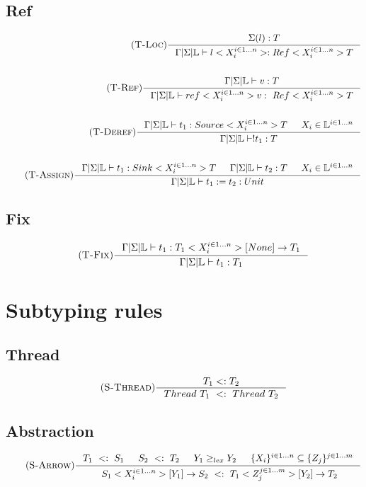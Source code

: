 \documentclass[12pt]{article}
\def\lock {\mathbb{L}}
\begin{document}
\subsection{Ref}
\begin{align*}
    \tag {\textsc{T-Loc}}
    \inference[]{\Sigma(l):T}{\Gamma|\Sigma|\lock \vdash l<X_i^{i\in 1...n}>:Ref<X_i^{i\in 1...n}>T}
    \\
    \\
    \tag {\textsc{T-Ref}}
    \inference[]{\Gamma|\Sigma|\lock \vdash v:T}{\Gamma|\Sigma|\lock \vdash ref<X_i^{i\in 1...n}> v:~Ref<X_i^{i\in 1...n}>T}
    \\
    \\
    \tag {\textsc{T-Deref}}
    \inference[]{\Gamma|\Sigma|\lock \vdash t_1:Source<X_i^{i\in 1...n}>T & X_i\in \lock^{i\in 1...n}}{\Gamma|\Sigma|\lock\vdash !t_1:T}
    \\
    \\
    \tag {\textsc{T-Assign}}
    \inference[]{\Gamma|\Sigma|\lock \vdash t_1:Sink<X_i^{i\in 1...n}>T & \Gamma|\Sigma|\lock \vdash t_2:T & X_i\in \lock^{i\in 1...n}}{\Gamma|\Sigma|\lock\vdash t_1 := t_2:Unit}
\end{align*}

\subsection{Fix}
\begin{align*}
\tag {\textsc{T-Fix}}
\inference[]{\Gamma|\Sigma|\lock \vdash t_1:T_1<X_i^{i\in 1...n}>[None]->T_1}{\Gamma|\Sigma|\lock\vdash t_1:T_1}
\end{align*}

\section{Subtyping rules}

\subsection{Thread}
\begin{align*}
    \tag {\textsc{S-Thread}}
    \inference[]{T_1 <: T_2}{ Thread~T_1~<:~Thread~T_2}
\end{align*}

\subsection{Abstraction}
\begin{align*}
\tag {\textsc{S-Arrow}}
\inference[]{
    T_1~<:~S_1 & S_2~<:~T_2 & Y_1 \ge_{lex} Y_2 &\{X_i\}^{i\in 1...n} \subseteq   \{Z_j\}^{j\in 1...m}
    }{~S_1<X_i^{i\in 1...n}>[Y_1]\rightarrow S_2~<:~T_1<Z_j^{j\in 1...m}>[Y_2]\rightarrow T_2}
    \\
    \\
\\
\end{align*}
\end{document}
